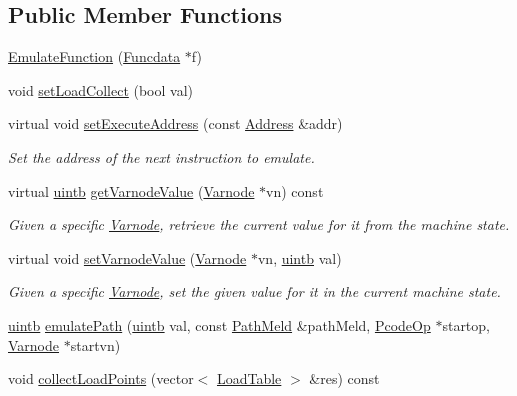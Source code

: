 \subsection*{Public Member Functions}
\begin{DoxyCompactItemize}
\item 
\mbox{\hyperlink{class_emulate_function_a5693cdd5aff9468316dedea0e56c26b0}{Emulate\+Function}} (\mbox{\hyperlink{class_funcdata}{Funcdata}} $\ast$f)
\item 
void \mbox{\hyperlink{class_emulate_function_a4864478645ced2cdee8cf59547be7fa7}{set\+Load\+Collect}} (bool val)
\item 
virtual void \mbox{\hyperlink{class_emulate_function_abdda883c4bab425f1c060fcc6c867b25}{set\+Execute\+Address}} (const \mbox{\hyperlink{class_address}{Address}} \&addr)
\begin{DoxyCompactList}\small\item\em Set the address of the next instruction to emulate. \end{DoxyCompactList}\item 
virtual \mbox{\hyperlink{types_8h_a2db313c5d32a12b01d26ac9b3bca178f}{uintb}} \mbox{\hyperlink{class_emulate_function_aea3a1fca2e8073ab6e7bcff5f05a74ca}{get\+Varnode\+Value}} (\mbox{\hyperlink{class_varnode}{Varnode}} $\ast$vn) const
\begin{DoxyCompactList}\small\item\em Given a specific \mbox{\hyperlink{class_varnode}{Varnode}}, retrieve the current value for it from the machine state. \end{DoxyCompactList}\item 
virtual void \mbox{\hyperlink{class_emulate_function_a9b130aee822f3e00552259a3ecaf14ff}{set\+Varnode\+Value}} (\mbox{\hyperlink{class_varnode}{Varnode}} $\ast$vn, \mbox{\hyperlink{types_8h_a2db313c5d32a12b01d26ac9b3bca178f}{uintb}} val)
\begin{DoxyCompactList}\small\item\em Given a specific \mbox{\hyperlink{class_varnode}{Varnode}}, set the given value for it in the current machine state. \end{DoxyCompactList}\item 
\mbox{\hyperlink{types_8h_a2db313c5d32a12b01d26ac9b3bca178f}{uintb}} \mbox{\hyperlink{class_emulate_function_a0b6a72cd2a09edc2f9ca29503c435259}{emulate\+Path}} (\mbox{\hyperlink{types_8h_a2db313c5d32a12b01d26ac9b3bca178f}{uintb}} val, const \mbox{\hyperlink{class_path_meld}{Path\+Meld}} \&path\+Meld, \mbox{\hyperlink{class_pcode_op}{Pcode\+Op}} $\ast$startop, \mbox{\hyperlink{class_varnode}{Varnode}} $\ast$startvn)
\item 
void \mbox{\hyperlink{class_emulate_function_a92c3d9ddc113361c767f598ac892a7e9}{collect\+Load\+Points}} (vector$<$ \mbox{\hyperlink{class_load_table}{Load\+Table}} $>$ \&res) const
\end{DoxyCompactItemize}
